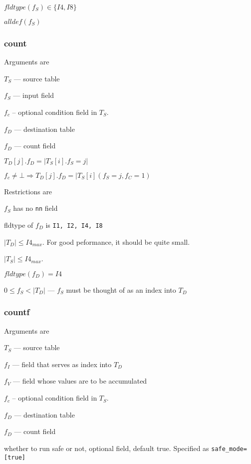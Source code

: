 \be
\item \(fldtype(f_S) \in \{I4, I8\}\)
\item \(alldef(f_S)\)
\ee


\subsubsection{count}
\label{count}
Arguments are 
\be
\item \(T_S\) --- source table
\item \(f_S\) --- input field 
\item \(f_c\) --  optional condition field in \(T_S\).
\item \(f_D\) --- destination table
\item \(f_D\) --- count field 
\ee

\(T_D[j].f_D = |T_S[i].f_S = j|\)

\(f_c \neq \bot \Rightarrow T_D[j].f_D = |T_S[i](f_S = j, f_C = 1)\)

Restrictions are 
\be
\item \(f_S\) has no {\tt nn} field 
\item fldtype of \(f_D\) is {\tt I1, I2, I4, I8}
\item \(|T_D| \leq I4_{max}\). For good peformance, it should be quite small.
\item \(|T_S| \leq I4_{max}\). 
\item \(fldtype(f_D) = I4\)
\item \(0 \leq f_S < |T_D| \) --- \(f_S\) must be thought of as an
index into \(T_D\)
\ee


\subsubsection{countf}
\label{countf}
Arguments are 
\be
\item \(T_S\) --- source table
\item \(f_I\) --- field that serves as index into \(T_D\)
\item \(f_V\) --- field whose values are to be accumulated
\item \(f_c\) --  optional condition field in \(T_S\).
\item \(f_D\) --- destination table
\item \(f_D\) --- count field 
\item whether to run safe or not, optional field, default true.
Specified as \verb+safe_mode=[true]+
\ee

